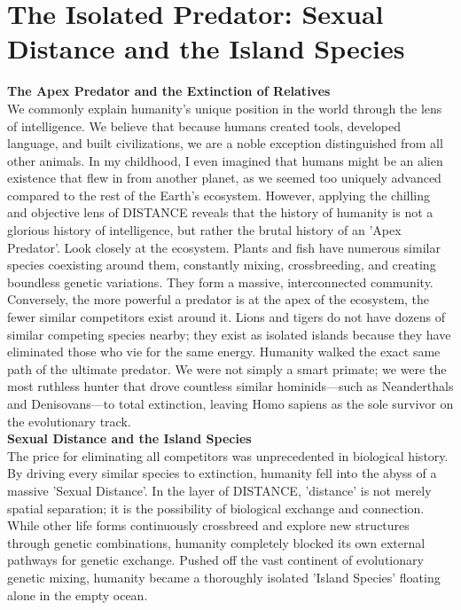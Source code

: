 

\section{The Isolated Predator: Sexual Distance and the Island Species}
\textbf{The Apex Predator and the Extinction of Relatives} \\
We commonly explain humanity's unique position in the world through the lens of intelligence. We believe that because humans created tools, developed language, and built civilizations, we are a noble exception distinguished from all other animals. In my childhood, I even imagined that humans might be an alien existence that flew in from another planet, as we seemed too uniquely advanced compared to the rest of the Earth's ecosystem. However, applying the chilling and objective lens of DISTANCE reveals that the history of humanity is not a glorious history of intelligence, but rather the brutal history of an 'Apex Predator'.
Look closely at the ecosystem. Plants and fish have numerous similar species coexisting around them, constantly mixing, crossbreeding, and creating boundless genetic variations. They form a massive, interconnected community. Conversely, the more powerful a predator is at the apex of the ecosystem, the fewer similar competitors exist around it. Lions and tigers do not have dozens of similar competing species nearby; they exist as isolated islands because they have eliminated those who vie for the same energy.
Humanity walked the exact same path of the ultimate predator. We were not simply a smart primate; we were the most ruthless hunter that drove countless similar hominids—such as Neanderthals and Denisovans—to total extinction, leaving Homo sapiens as the sole survivor on the evolutionary track.\\
\textbf{Sexual Distance and the Island Species} \\
The price for eliminating all competitors was unprecedented in biological history. By driving every similar species to extinction, humanity fell into the abyss of a massive 'Sexual Distance'.
In the layer of DISTANCE, 'distance' is not merely spatial separation; it is the possibility of biological exchange and connection. While other life forms continuously crossbreed and explore new structures through genetic combinations, humanity completely blocked its own external pathways for genetic exchange. Pushed off the vast continent of evolutionary genetic mixing, humanity became a thoroughly isolated 'Island Species' floating alone in the empty ocean.
